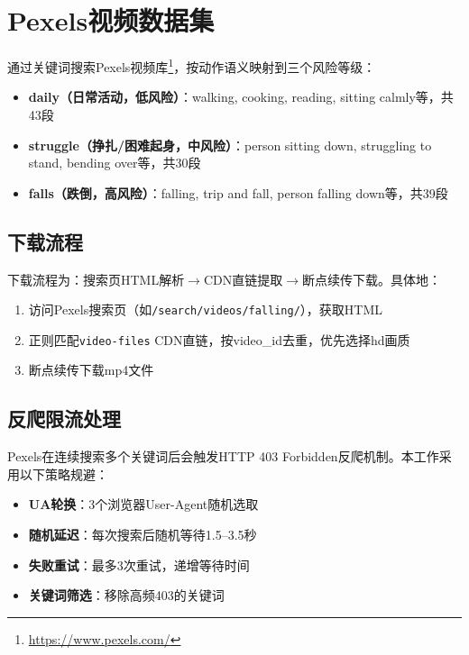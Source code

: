 \section{Pexels视频数据集}

通过关键词搜索Pexels视频库\footnote{\url{https://www.pexels.com/}}，按动作语义映射到三个风险等级：

\begin{itemize}
    \item \textbf{daily（日常活动，低风险）}：walking, cooking, reading, sitting calmly等，共43段
    \item \textbf{struggle（挣扎/困难起身，中风险）}：person sitting down, struggling to stand, bending over等，共30段
    \item \textbf{falls（跌倒，高风险）}：falling, trip and fall, person falling down等，共39段
\end{itemize}

\subsection{下载流程}

下载流程为：搜索页HTML解析$\to$CDN直链提取$\to$断点续传下载。具体地：

\begin{enumerate}
    \item 访问Pexels搜索页（如\texttt{/search/videos/falling/}），获取HTML
    \item 正则匹配\texttt{video-files} CDN直链，按video\_id去重，优先选择hd画质
    \item 断点续传下载mp4文件
\end{enumerate}

\subsection{反爬限流处理}

Pexels在连续搜索多个关键词后会触发HTTP 403 Forbidden反爬机制。本工作采用以下策略规避：

\begin{itemize}
    \item \textbf{UA轮换}：3个浏览器User-Agent随机选取
    \item \textbf{随机延迟}：每次搜索后随机等待1.5--3.5秒
    \item \textbf{失败重试}：最多3次重试，递增等待时间
    \item \textbf{关键词筛选}：移除高频403的关键词
\end{itemize}


